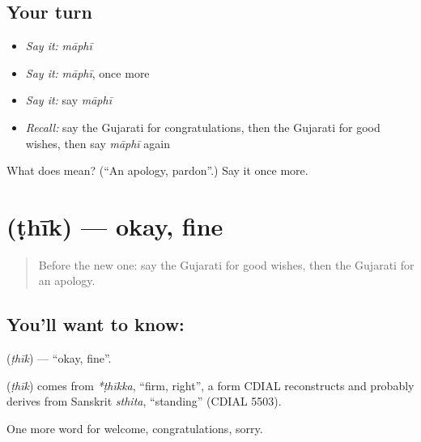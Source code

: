 \subsection*{Your turn}
\begin{itemize}
\raggedright
  \item \emph{Say it:} \emph{māphī}
  \item \emph{Say it:} \emph{māphī}, once more
  \item \emph{Say it:} say \emph{māphī}
  \item \emph{Recall:} say the Gujarati for congratulations, then the Gujarati for good wishes, then say \emph{māphī} again
\end{itemize}

\begin{tcolorbox}[breakable,colback=teal!4,colframe=teal!35!black,title={Before you move on}]
What does  mean? (\textquotedblleft{}An apology, pardon\textquotedblright{}.) Say it once more.
\end{tcolorbox}
\section[\texorpdfstring{\gu{ઠીક} (ṭhīk)}{ઠીક (ṭhīk)}]{ (ṭhīk) — okay, fine}

\label{lesson:GU-C91-okay}



\begin{quote}
Before the new one: say the Gujarati for good wishes, then the Gujarati for an apology.
\end{quote}

\subsection*{You'll want to know: }
\textbf{} (\emph{ṭhīk}) — \textquotedblleft{}okay, fine\textquotedblright{}.

\begin{cousinweb}
\textbf{} (\emph{ṭhīk}) comes from \emph{*ṭhīkka}, \textquotedblleft{}firm, right\textquotedblright{}, a form CDIAL reconstructs and probably derives from Sanskrit \emph{sthita}, \textquotedblleft{}standing\textquotedblright{} (CDIAL 5503).
\end{cousinweb}

\begin{grammarlens}[title={What you've built}]
One more word for welcome, congratulations, sorry.
\end{grammarlens}

